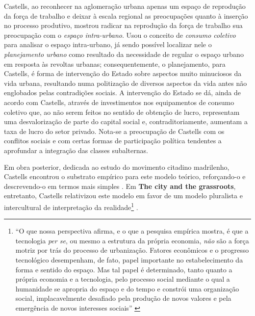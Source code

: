 Castells, ao reconhecer na aglomeração urbana apenas um espaço de reprodução da força de trabalho e deixar à escala regional as preocupações quanto à inserção no processo produtivo, mostrou radicar na reprodução da força de trabalho sua preocupação com o \textit{espaço intra-urbano}. Usou o conceito de \textit{consumo coletivo} para analisar o espaço intra-urbano, já sendo possível localizar nele o \textit{planejamento urbano} como resultado da necessidade de regular o espaço urbano em resposta às revoltas urbanas; consequentemente, o planejamento, para Castells, é forma de intervenção do Estado sobre aspectos muito minuciosos da vida urbana, resultando numa politização de diversos aspectos da vida antes não englobados pelas contradições sociais. A intervenção do Estado se dá, ainda de acordo com Castells, através de investimentos nos equipamentos de consumo coletivo que, ao não serem feitos no sentido de obtenção de lucro, representam uma desvalorização de parte do capital social e, contraditoriamente, aumentam a taxa de lucro do setor privado. Nota-se a preocupação de Castells com os conflitos sociais e com certas formas de participação política tendentes a aprofundar a integração das classes subalternas.

Em obra posterior, dedicada ao estudo do movimento citadino madrilenho, Castells encontrou o substrato empírico para este modelo teórico, reforçando-o e descrevendo-o em termos mais simples \cite[p.~20-25]{CASTELLS1980}. Em \textbf{The city and the grassroots}, entretanto, Castells relativizou este modelo em favor de um modelo pluralista e intercultural de interpretação da realidade\footnote{``O que nossa perspectiva afirma, e o que a pesquisa empírica mostra, é que a tecnologia \textit{per se}, ou mesmo a estrutura da própria economia, \textit{não} são a força motriz  por trás do processo de urbanização. Fatores econômicos e o progresso tecnológico desempenham, de fato, papel importante no estabelecimento da forma e sentido do espaço. Mas tal papel é determinado, tanto quanto a própria economia e a tecnologia, pelo processo social mediante o qual a humanidade se apropria do espaço e do tempo e constrói uma organização social, implacavelmente desafiado pela produção de novos valores e pela emergência de novos interesses sociais'' \cite[p.~291]{CASTELLS1983}} \cite{CASTELLS1983}.

